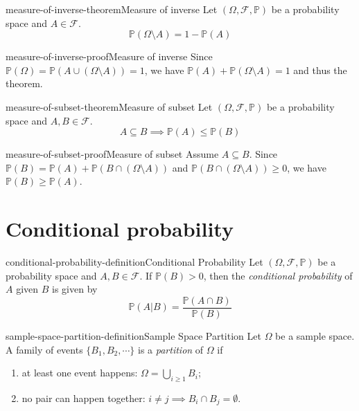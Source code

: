 \documentclass[preview]{standalone}
\begin{document}
\begin{snippettheorem}{measure-of-inverse-theorem}{Measure of inverse}
    Let \((\Omega, \mathcal{F}, \mathbb{P})\) be a probability space and \(A \in \mathcal{F}\).
    \[
        \mathbb{P}(\Omega \setminus A) = 1 - \mathbb{P}(A)
    \]
\end{snippettheorem}

\begin{snippetproof}{measure-of-inverse-proof}{Measure of inverse}
    Since \(\mathbb{P}(\Omega) = \mathbb{P}(A \cup (\Omega \setminus A)) = 1\),
    we have \(\mathbb{P}(A) + \mathbb{P}(\Omega \setminus A) = 1\)
    and thus the theorem.
\end{snippetproof}

\begin{snippettheorem}{measure-of-subset-theorem}{Measure of subset}
    Let \((\Omega, \mathcal{F}, \mathbb{P})\) be a probability space and \(A, B \in \mathcal{F}\).
    \[
        A \subseteq B \implies \mathbb{P}(A) \leq \mathbb{P}(B)
    \]
\end{snippettheorem}

\begin{snippetproof}{measure-of-subset-proof}{Measure of subset}
    Assume \(A \subseteq B\). Since \(\mathbb{P}(B) = \mathbb{P}(A) + \mathbb{P}(B \cap (\Omega \setminus A))\)
    and \(\mathbb{P}(B \cap (\Omega \setminus A)) \geq 0\), we have \(\mathbb{P}(B) \geq \mathbb{P}(A)\).
\end{snippetproof}

\section{Conditional probability}

\begin{snippetdefinition}{conditional-probability-definition}{Conditional Probability}
    Let \((\Omega, \mathcal{F}, \mathbb{P})\) be a probability space
    and \(A, B \in \mathcal{F}\).
    If \(\mathbb{P}(B) > 0\), then the \textit{conditional probability} of \(A\) given \(B\)
    is given by
    \[
        \mathbb{P}(A|B) = \frac{\mathbb{P}(A \cap B)}{\mathbb{P}(B)}
    \]
\end{snippetdefinition}

\begin{snippetdefinition}{sample-space-partition-definition}{Sample Space Partition}
    Let \(\Omega\) be a sample space.
    A family of events \(\{B_1,B_2, \cdots\}\)
    is a \textit{partition} of \(\Omega\) if
    \begin{enumerate}
        \item at least one event happens: \(\Omega = \bigcup_{i \geq 1} B_i\);
        \item no pair can happen together: \(i \neq j \implies B_i \cap B_j = \emptyset\).
    \end{enumerate}
\end{snippetdefinition}
\end{document}
